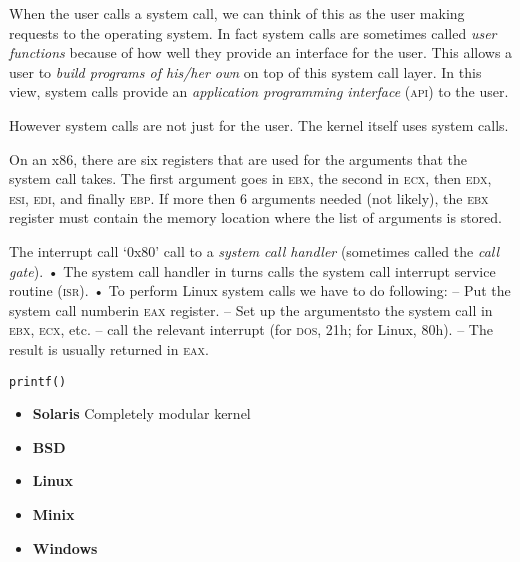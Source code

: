 When the user calls a system call, we can think of this as the user making 
requests to the operating system. In fact system calls are sometimes called
\textit{user functions} because of how well they provide an interface for the user. 
This allows a user to \textit{build programs of his/her own} on top of this system call layer. 
In this view, system calls provide an \textit{application programming interface} 
(\textsc{api}) 
to the user.


However system calls are not just for the user. The kernel itself 
uses system calls. 

\frmrule

On an x86, there are six registers that are used for the arguments that
the system call takes. The first argument goes in \textsc{ebx}, the
second in \textsc{ecx}, then \textsc{edx}, \textsc{esi}, \textsc{edi}, and 
finally \textsc{ebp}. If
more then 6 arguments needed (not likely), the \textsc{ebx}
register must contain the memory location where the list of arguments is stored.

The interrupt call ‘0x80’ call to a \textit{system call handler} (sometimes
called the \textit{call gate}).
• The system call handler in turns calls the system call interrupt
service routine (\textsc{isr}).
• To perform Linux system calls we have to do following:
– Put the system call numberin \textsc{eax} register.
– Set up the argumentsto the system call in \textsc{ebx}, \textsc{ecx}, etc.
– call the relevant interrupt (for \textsc{dos}, 21h; for Linux,
80h).
– The result is usually returned in \textsc{eax}.


\begin{example}

\begin{lstlisting}
printf()
\end{lstlisting}
\end{example}





\begin{itemize}   
\renewcommand{\labelitemi}{$\Box$}
\item \textbf{Solaris} 
Completely modular kernel
\item \textbf{BSD} 
\item \textbf{Linux} 
\item \textbf{Minix} 
\item \textbf{Windows} 
\end{itemize}

